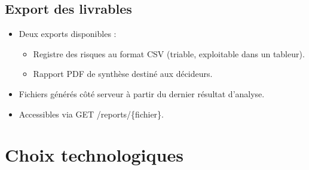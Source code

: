 \documentclass[12pt,a4paper]{article}
\newcommand{\forcereset}[1]{%
    \needspace{#1\baselineskip}%
}
\begin{document}
\subsection{Export des livrables}
\forcereset{4}
\begin{itemize}[leftmargin=1.2cm, itemsep=0.2\baselineskip]
    \item Deux exports disponibles :
        \begin{itemize}
            \item Registre des risques au format CSV (triable, exploitable dans un tableur).
            \item Rapport PDF de synthèse destiné aux décideurs.
        \end{itemize}
    \item Fichiers générés côté serveur à partir du dernier résultat d'analyse.
    \item Accessibles via GET /reports/\{fichier\}.
\end{itemize}

\newpage

\section{Choix technologiques}
\end{document}
